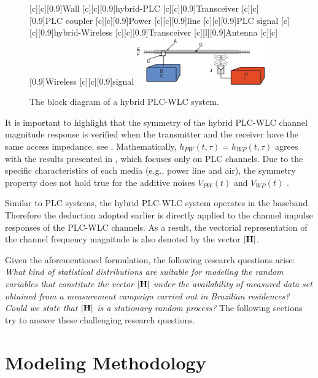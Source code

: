 \documentclass[journal]{IEEEtran}
\begin{document}
\begin{figure}[h]
	\centering
	[c][0.9]{Wall}
	[c][0.9]{hybrid-PLC}
	[c][0.9]{Transceiver}
	[c][0.9]{PLC coupler}
	[c][0.9]{Power}
	[c][0.9]{line}
	[c][0.9]{PLC signal}
	[c][0.9]{hybrid-Wireless}
	[c][0.9]{Transceiver}
	[l][0.9]{Antenna}
	[c][0.9]{Wireless}
	[c][0.9]{signal}
	\includegraphics[width=0.49\textwidth]{images/Hybrid_channel.eps}
	\caption{The block diagram of a hybrid PLC-WLC system.}
	\label{Hybchannel}
\end{figure}

It is important to highlight that the symmetry of the hybrid \ac{PLC}-\ac{WLC} channel magnitude response is verified when the transmitter and the receiver have the same access impedance, see \cite{thiago:hyb}. Mathematically, $h_{PW}(t,\tau)=h_{WP}(t,\tau)$ agrees with the results presented in \cite{Galli:indoor}, which focuses only on \ac{PLC} channels. Due to the specific characteristics of each media (e.g., power line and air), the symmetry property does not hold true for the additive noises $V_{PW}(t)$ and $V_{WP}(t)$ \cite{thiago:hyb}. 

Similar to \ac{PLC} systems, the hybrid \ac{PLC}-\ac{WLC} system operates in the baseband. Therefore the deduction adopted earlier is directly applied to the channel impulse responses of the \ac{PLC}-\ac{WLC} channels. As a result, the vectorial representation of the channel frequency magnitude is also denoted by the vector $|{\bf H}|$. 
 
Given the aforementioned formulation, the following research questions arise: \textit{What kind of statistical distributions are suitable for modeling the random variables that constitute the vector $|{\bf H}|$ under the availability of measured data set obtained from a measurement campaign carried out in Brazilian residences? Could we state that $|{\bf H}|$ is a stationary random process?} The following sections try to answer these challenging research questions.

\section{Modeling Methodology}
\end{document}
